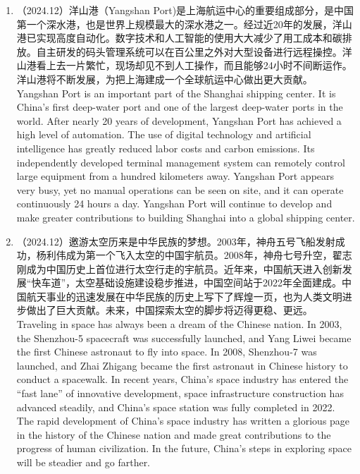 ﻿\documentclass[lang=cn,11pt]{elegantbook}
\begin{document}
\begin{enumerate}
    \item （2024.12）洋山港（Yangshan Port)是上海航运中心的重要组成部分，是中国第一个深水港，也是世界上规模最大的深水港之一。经过近20年的发展，洋山港已实现高度自动化。数字技术和人工智能的使用大大减少了用工成本和碳排放。自主研发的码头管理系统可以在百公里之外对大型设备进行远程操控。洋山港看上去一片繁忙，现场却见不到人工操作，而且能够24小时不间断运作。洋山港将不断发展，为把上海建成一个全球航运中心做出更大贡献。\\Yangshan Port is an important part of the Shanghai shipping center. It is China’s first deep-water port and one of the largest deep-water ports in the world. After nearly 20 years of development, Yangshan Port has achieved a high level of automation. The use of digital technology and artificial intelligence has greatly reduced labor costs and carbon emissions. Its independently developed terminal management system can remotely control large equipment from a hundred kilometers away. Yangshan Port appears very busy, yet no manual operations can be seen on site, and it can operate continuously 24 hours a day. Yangshan Port will continue to develop and make greater contributions to building Shanghai into a global shipping center.
    \item （2024.12）邀游太空历来是中华民族的梦想。2003年，神舟五号飞船发射成功，杨利伟成为第一个飞入太空的中国宇航员。2008年，神舟七号升空，翟志刚成为中国历史上首位进行太空行走的宇航员。近年来，中国航天进入创新发展“快车道”，太空基础设施建设稳步推进，中国空间站于2022年全面建成。中国航天事业的迅速发展在中华民族的历史上写下了辉煌一页，也为人类文明进步做出了巨大贡献。未来，中国探索太空的脚步将迈得更稳、更远。\\Traveling in space has always been a dream of the Chinese nation. In 2003, the Shenzhou-5 spacecraft was successfully launched, and Yang Liwei became the first Chinese astronaut to fly into space. In 2008, Shenzhou-7 was launched, and Zhai Zhigang became the first astronaut in Chinese history to conduct a spacewalk. In recent years, China’s space industry has entered the “fast lane” of innovative development, space infrastructure construction has advanced steadily, and China’s space station was fully completed in 2022. The rapid development of China’s space industry has written a glorious page in the history of the Chinese nation and made great contributions to the progress of human civilization. In the future, China’s steps in exploring space will be steadier and go farther.

\end{enumerate}
\end{document}
